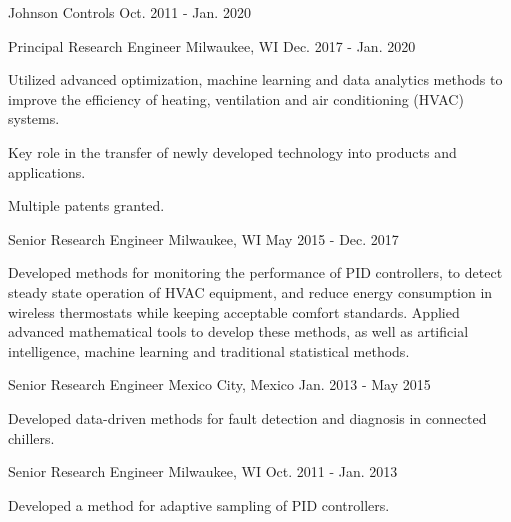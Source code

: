 

\begin{cventries}

\cvmultientry
{Johnson Controls} %
{}
{Oct. 2011 - Jan. 2020} %
{
\cvsubentry
{Principal Research Engineer} %
{Milwaukee, WI} %
{Dec. 2017 - Jan. 2020} %
{
\begin{cvitems} %
\item {Utilized advanced optimization, machine learning and data analytics methods to improve the efficiency of heating, ventilation and air conditioning (HVAC) systems.}
\item {Key role in the transfer of newly developed technology into products and applications.}
\item {Multiple patents granted.}
\end{cvitems}
}
\cvsubentry
{Senior Research Engineer} %
{Milwaukee, WI} %
{May 2015 - Dec. 2017} %
{
\begin{cvitems} %
\item {Developed methods for monitoring the performance of PID controllers, to detect steady state operation of HVAC equipment, and reduce energy consumption in wireless thermostats while keeping acceptable comfort standards. Applied advanced mathematical tools to develop these methods, as well as artificial intelligence, machine learning and traditional statistical methods.}
\end{cvitems}
}
\cvsubentry
{Senior Research Engineer} %
{Mexico City, Mexico} %
{Jan. 2013 - May 2015} %
{
\begin{cvitems} %
\item {Developed data-driven methods for fault detection and diagnosis in connected chillers.}
\end{cvitems}
}
\cvsubentry
{Senior Research Engineer} %
{Milwaukee, WI} %
{Oct. 2011 - Jan. 2013} %
{
\begin{cvitems} %
\item {Developed a method for adaptive sampling of PID controllers.}
\end{cvitems}
}
}
\end{cventries}
